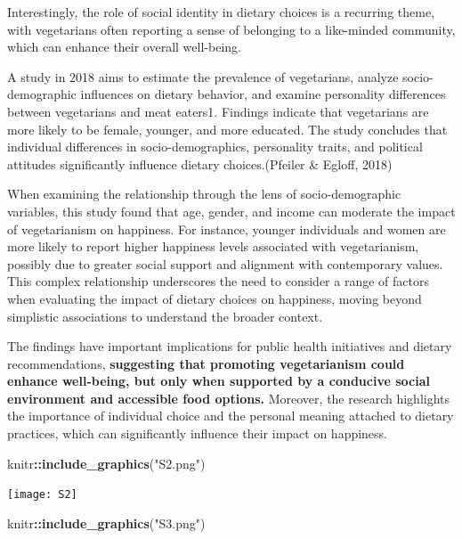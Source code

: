 \documentclass[
]{article}
\newenvironment{Shaded}{\begin{snugshade}}{\end{snugshade}}
\newcommand{\FunctionTok}[1]{\textcolor[rgb]{0.13,0.29,0.53}{\textbf{#1}}}
\newcommand{\NormalTok}[1]{#1}
\newcommand{\SpecialCharTok}[1]{\textcolor[rgb]{0.81,0.36,0.00}{\textbf{#1}}}
\newcommand{\StringTok}[1]{\textcolor[rgb]{0.31,0.60,0.02}{#1}}
\begin{document}
Interestingly, the role of social identity in dietary choices is a
recurring theme, with vegetarians often reporting a sense of belonging
to a like-minded community, which can enhance their overall well-being.

A study in 2018 aims to estimate the prevalence of vegetarians, analyze
socio-demographic influences on dietary behavior, and examine
personality differences between vegetarians and meat eaters1. Findings
indicate that vegetarians are more likely to be female, younger, and
more educated. The study concludes that individual differences in
socio-demographics, personality traits, and political attitudes
significantly influence dietary choices.(Pfeiler \& Egloff, 2018)

When examining the relationship through the lens of socio-demographic
variables, this study found that age, gender, and income can moderate
the impact of vegetarianism on happiness. For instance, younger
individuals and women are more likely to report higher happiness levels
associated with vegetarianism, possibly due to greater social support
and alignment with contemporary values. This complex relationship
underscores the need to consider a range of factors when evaluating the
impact of dietary choices on happiness, moving beyond simplistic
associations to understand the broader context.

The findings have important implications for public health initiatives
and dietary recommendations, \textbf{suggesting that promoting
vegetarianism could enhance well-being, but only when supported by a
conducive social environment and accessible food options.} Moreover, the
research highlights the importance of individual choice and the personal
meaning attached to dietary practices, which can significantly influence
their impact on happiness.

\begin{Shaded}
\begin{Highlighting}[]
\NormalTok{knitr}\SpecialCharTok{::}\FunctionTok{include\_graphics}\NormalTok{(}\StringTok{"S2.png"}\NormalTok{)}
\end{Highlighting}
\end{Shaded}

\texttt{[image: S2]}

\begin{Shaded}
\begin{Highlighting}[]
\NormalTok{knitr}\SpecialCharTok{::}\FunctionTok{include\_graphics}\NormalTok{(}\StringTok{"S3.png"}\NormalTok{)}
\end{Highlighting}
\end{Shaded}
\end{document}
